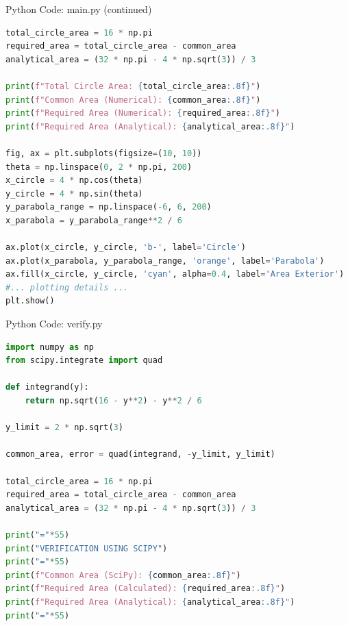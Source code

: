 \documentclass{beamer}
\numberwithin{equation}{section}
\theoremstyle{remark}
\begin{document}
\begin{frame}[fragile]{Python Code: main.py (continued)}
\begin{lstlisting}[language=Python]
total_circle_area = 16 * np.pi
required_area = total_circle_area - common_area
analytical_area = (32 * np.pi - 4 * np.sqrt(3)) / 3

print(f"Total Circle Area: {total_circle_area:.8f}")
print(f"Common Area (Numerical): {common_area:.8f}")
print(f"Required Area (Numerical): {required_area:.8f}")
print(f"Required Area (Analytical): {analytical_area:.8f}")

fig, ax = plt.subplots(figsize=(10, 10))
theta = np.linspace(0, 2 * np.pi, 200)
x_circle = 4 * np.cos(theta)
y_circle = 4 * np.sin(theta)
y_parabola_range = np.linspace(-6, 6, 200)
x_parabola = y_parabola_range**2 / 6

ax.plot(x_circle, y_circle, 'b-', label='Circle')
ax.plot(x_parabola, y_parabola_range, 'orange', label='Parabola')
ax.fill(x_circle, y_circle, 'cyan', alpha=0.4, label='Area Exterior')
#... plotting details ...
plt.show()
\end{lstlisting}
\end{frame}


\begin{frame}[fragile]{Python Code: verify.py}
\begin{lstlisting}[language=Python]
import numpy as np
from scipy.integrate import quad

def integrand(y):
    return np.sqrt(16 - y**2) - y**2 / 6

y_limit = 2 * np.sqrt(3)

common_area, error = quad(integrand, -y_limit, y_limit)

total_circle_area = 16 * np.pi
required_area = total_circle_area - common_area
analytical_area = (32 * np.pi - 4 * np.sqrt(3)) / 3

print("="*55)
print("VERIFICATION USING SCIPY")
print("="*55)
print(f"Common Area (SciPy): {common_area:.8f}")
print(f"Required Area (Calculated): {required_area:.8f}")
print(f"Required Area (Analytical): {analytical_area:.8f}")
print("="*55)
\end{lstlisting}
\end{frame}
\end{document}
